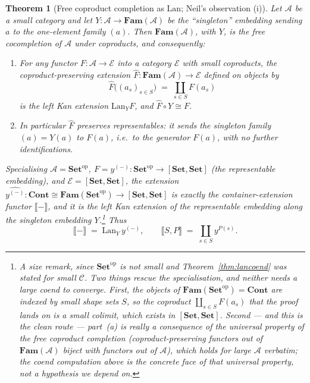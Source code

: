\documentclass[11pt]{article}
\theoremstyle{plain}
\newtheorem{theorem}{Theorem}[section]
\theoremstyle{definition}
\newcommand{\Set}{\mathbf{Set}}
\newcommand{\Cont}{\mathbf{Cont}}
\newcommand{\Fam}{\mathbf{Fam}}
\newcommand{\op}{^{\mathrm{op}}}
\newcommand{\Lan}{\mathrm{Lan}}
\newcommand{\iso}{\cong}
\newcommand{\ext}[1]{\llbracket #1 \rrbracket}
\begin{document}
\begin{theorem}[Free coproduct completion as $\Lan$; Neil's observation (i)]
\label{thm:neil1}
Let $\mathcal{A}$ be a small category and let
$Y\colon\mathcal{A}\to\Fam(\mathcal{A})$ be the ``singleton'' embedding sending
$a$ to the one-element family $(a)$. Then $\Fam(\mathcal{A})$, with $Y$, is the
free cocompletion of $\mathcal{A}$ under coproducts, and consequently:
\begin{enumerate}
\item[\textup{(a)}] For any functor $F\colon\mathcal{A}\to\mathcal{E}$ into a
category $\mathcal{E}$ with small coproducts, the \emph{coproduct-preserving}
extension $\widehat{F}\colon\Fam(\mathcal{A})\to\mathcal{E}$ defined on objects by
\[
  \widehat{F}\bigl((a_{s})_{s\in S}\bigr) \;=\; \coprod_{s\in S} F(a_{s})
\]
is the left Kan extension $\Lan_{Y}F$, and $\widehat{F}\circ Y\iso F$.
\item[\textup{(b)}] In particular $\widehat{F}$ \emph{preserves representables}:
it sends the singleton family $(a)=Y(a)$ to $F(a)$, i.e.\ to the generator
$F(a)$, with no further identifications.
\end{enumerate}
Specialising $\mathcal{A}=\Set\op$, $F = y^{(-)}\colon\Set\op\to[\Set,\Set]$ (the
representable embedding), and $\mathcal{E}=[\Set,\Set]$, the extension
$\widehat{y^{(-)}}\colon\Cont\iso\Fam(\Set\op)\to[\Set,\Set]$ is exactly the
container-extension functor $\ext{-}$, and it is the left Kan extension of the
representable embedding along the singleton embedding
$Y$.\footnote{A size remark, since $\Set\op$ is \emph{not} small and
Theorem~\ref{thm:lancoend} was stated for small $\mathcal C$. Two things rescue
the specialisation, and neither needs a large coend to converge. First, the
objects of $\Fam(\Set\op)=\Cont$ are indexed by \emph{small} shape sets $S$, so
the coproduct $\coprod_{s\in S}F(a_s)$ that the proof lands on is a small
colimit, which exists in $[\Set,\Set]$. Second --- and this is the clean route
--- part~(a) is really a consequence of the \emph{universal property} of the free
coproduct completion (coproduct-preserving functors out of $\Fam(\mathcal A)$
biject with functors out of $\mathcal A$), which holds for large $\mathcal A$
verbatim; the coend computation above is the concrete face of that universal
property, not a hypothesis we depend on.} Thus
\[
  \ext{-}\;=\;\Lan_{Y}\,y^{(-)}, \qquad
  \ext{S,P} \;=\; \coprod_{s\in S} y^{P(s)} .
\]
\end{theorem}
\end{document}
